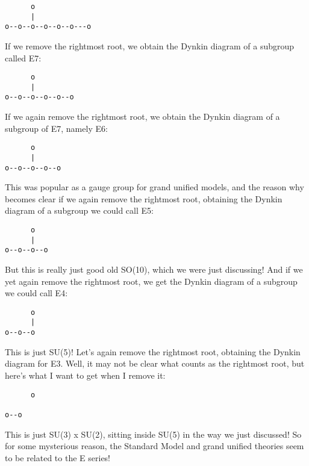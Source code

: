 \begin{verbatim}
      o      
      |      
o--o--o--o--o--o---o

\end{verbatim}
    
If we remove the rightmost root, we obtain the Dynkin diagram of
a subgroup called E7:

\begin{verbatim}
      o      
      |      
o--o--o--o--o--o

\end{verbatim}
    
If we again remove the rightmost root, we obtain the Dynkin diagram
of a subgroup of E7, namely E6:

\begin{verbatim}
      o      
      |      
o--o--o--o--o

\end{verbatim}
    
This was popular as a gauge group for grand unified models, and 
the reason why becomes clear if we again remove the rightmost root,
obtaining the Dynkin diagram of a subgroup we could call E5:

\begin{verbatim}
      o      
      |      
o--o--o--o

\end{verbatim}
    
But this is really just good old SO(10), which we were just
discussing!  And if we yet again remove the rightmost root, we 
get the Dynkin diagram of a subgroup we could call E4:

\begin{verbatim}
      o      
      |      
o--o--o

\end{verbatim}
    
This is just SU(5)!  Let's again remove the rightmost root, 
obtaining the Dynkin diagram for E3.  Well, it may not be clear
what counts as the rightmost root, but here's what I want to 
get when I remove it:

\begin{verbatim}
      o      
            
o--o

\end{verbatim}
    
This is just SU(3) x SU(2), sitting inside SU(5) in the way we just
discussed!  So for some mysterious reason, the Standard Model and
grand unified theories seem to be related to the E series!  

